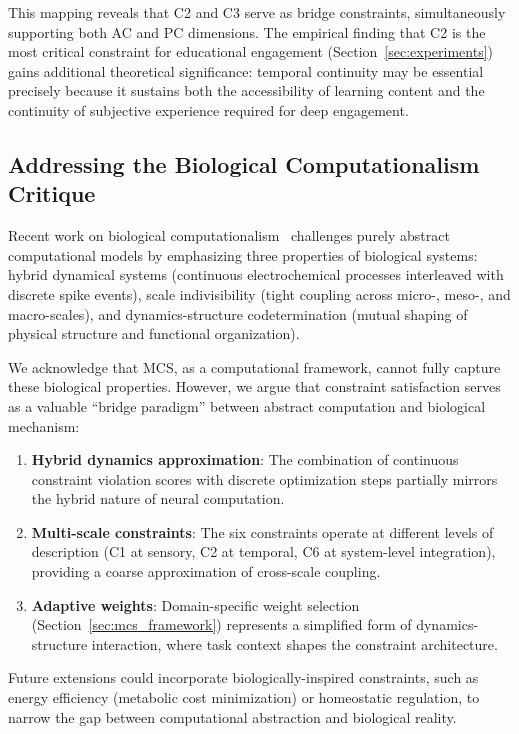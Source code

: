 \documentclass[10pt,journal,compsoc]{IEEEtran}
\begin{document}
This mapping reveals that C2 and C3 serve as bridge constraints, simultaneously supporting both AC and PC dimensions. The empirical finding that C2 is the most critical constraint for educational engagement (Section~\ref{sec:experiments}) gains additional theoretical significance: temporal continuity may be essential precisely because it sustains both the accessibility of learning content and the continuity of subjective experience required for deep engagement.

\subsection{Addressing the Biological Computationalism Critique}

Recent work on biological computationalism~\cite{Milinkovic2025} challenges purely abstract computational models by emphasizing three properties of biological systems: hybrid dynamical systems (continuous electrochemical processes interleaved with discrete spike events), scale indivisibility (tight coupling across micro-, meso-, and macro-scales), and dynamics-structure codetermination (mutual shaping of physical structure and functional organization).

We acknowledge that MCS, as a computational framework, cannot fully capture these biological properties. However, we argue that constraint satisfaction serves as a valuable ``bridge paradigm'' between abstract computation and biological mechanism:

\begin{enumerate}
    \item \textbf{Hybrid dynamics approximation}: The combination of continuous constraint violation scores with discrete optimization steps partially mirrors the hybrid nature of neural computation.
    \item \textbf{Multi-scale constraints}: The six constraints operate at different levels of description (C1 at sensory, C2 at temporal, C6 at system-level integration), providing a coarse approximation of cross-scale coupling.
    \item \textbf{Adaptive weights}: Domain-specific weight selection (Section~\ref{sec:mcs_framework}) represents a simplified form of dynamics-structure interaction, where task context shapes the constraint architecture.
\end{enumerate}

Future extensions could incorporate biologically-inspired constraints, such as energy efficiency (metabolic cost minimization) or homeostatic regulation, to narrow the gap between computational abstraction and biological reality.
\end{document}
